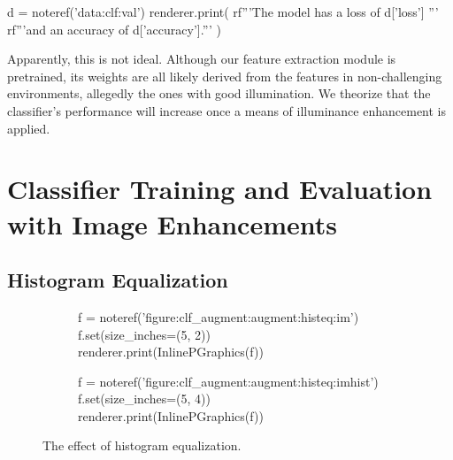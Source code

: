 \documentclass[letterpaper]{article} %
\begin{document}
\begin{python}
  d = noteref('data:clf:val')
  renderer.print(
    rf'''The model has a loss of {d['loss']} ''' 
    rf'''and an accuracy of {d['accuracy']}.'''
  )
\end{python}

Apparently, this is not ideal. 
Although our feature extraction module is pretrained,
its weights are all likely derived from 
the features in non-challenging environments,
allegedly the ones with good illumination.
We theorize that the classifier's performance will increase
once a means of illuminance enhancement is applied.

\section{Classifier Training and Evaluation with Image Enhancements}
\subsection{Histogram Equalization}
\begin{figure*}[t!]
  \centering
  \renewcommand\sffamily{}
  \begin{subfigure}[t]{\textwidth}
    \centering
    \begin{python}
      f = noteref('figure:clf_augment:augment:histeq:im')
      f.set(size_inches=(5, 2))
      renderer.print(InlinePGraphics(f))
    \end{python}
  \end{subfigure}
  \begin{subfigure}[t]{\textwidth}
    \centering
    \begin{python}
      f = noteref('figure:clf_augment:augment:histeq:imhist')
      f.set(size_inches=(5, 4))
      renderer.print(InlinePGraphics(f))
    \end{python}
  \end{subfigure}
  \caption{
    The effect of histogram equalization.
  }\label{figure:clf_augment:augment:histeq}
\end{figure*}
\end{document}
